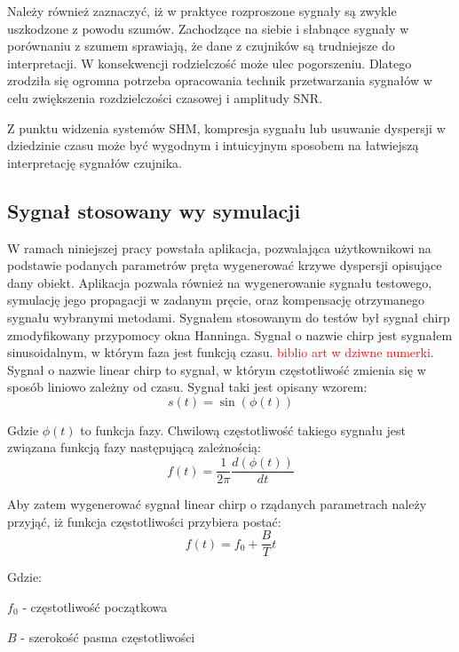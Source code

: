 Należy również zaznaczyć, iż w praktyce rozproszone sygnały są zwykle uszkodzone z powodu szumów. Zachodzące na siebie i słabnące sygnały w porównaniu z szumem sprawiają, że dane z czujników są trudniejsze do interpretacji. W konsekwencji rodzielczość może ulec pogorszeniu. Dlatego zrodziła się ogromna potrzeba opracowania technik przetwarzania sygnałów w celu zwiększenia rozdzielczości czasowej i amplitudy SNR.

Z punktu widzenia systemów SHM, kompresja sygnału lub usuwanie dyspersji w dziedzinie czasu może być wygodnym i intuicyjnym sposobem na łatwiejszą interpretację sygnałów czujnika.

\subsection{Sygnał stosowany wy symulacji}
W ramach niniejszej pracy powstała aplikacja, pozwalająca użytkownikowi na podstawie podanych parametrów pręta wygenerować krzywe dyspersji opisujące dany obiekt. Aplikacja pozwala również na wygenerowanie sygnału testowego, symulację jego propagacji w zadanym pręcie, oraz kompensację otrzymanego sygnału wybranymi metodami. Sygnałem stosowanym do testów był sygnał chirp zmodyfikowany przypomocy okna Hanninga.
	Sygnał o nazwie chirp jest sygnałem sinusoidalnym, w którym faza jest funkcją czasu. \textcolor{red}{biblio art w dziwne numerki}. Sygnał o nazwie linear chirp to sygnał, w którym częstotliwość zmienia się w sposób liniowo zależny od czasu. Sygnał taki jest opisany wzorem:
	\begin{equation}
	s(t) = \sin(\phi (t))
	\end{equation}
	
	Gdzie $\phi (t)$ to funkcja fazy. Chwilową częstotliwość takiego sygnału jest związana funkcją fazy następującą zależnością:
	\begin{equation}
	f(t) = \frac{1}{2\pi}\frac{d(\phi (t))}{dt} \label{eq:f(t)_z_phi}
	\end{equation}
	
	Aby zatem wygenerować sygnał linear chirp o rządanych parametrach należy przyjąć, iż funkcja częstotliwości przybiera postać:
	\begin{equation}
	f(t) = f_0+\frac{B}{T}t \label{eq:f(t)_liniowo}
	\end{equation}
	
	Gdzie:
	
	$f_0$ - częstotliwość początkowa
	
	$B$ - szerokość pasma częstotliwości
	
